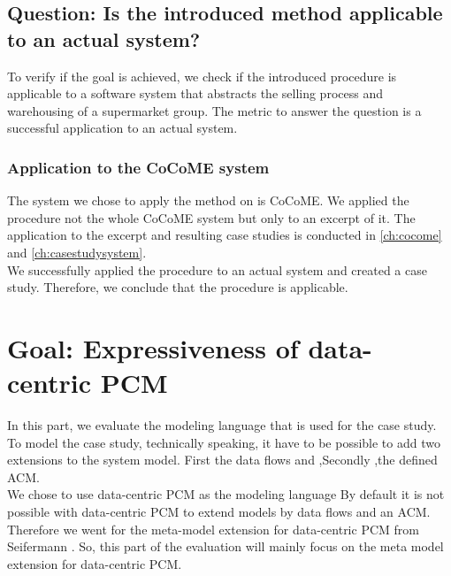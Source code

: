 \subsection{Question: Is the introduced method applicable to an actual system?}
To verify if the goal is achieved, we check if the introduced procedure is applicable to a software system that abstracts the selling process and warehousing of a supermarket group. The metric to answer the question is a successful application to an actual system.  
\subsubsection{Application to the CoCoME system}
The system we chose to apply the method on is CoCoME. We applied the procedure not the whole CoCoME system but only to an excerpt of it. The application to the excerpt and resulting case studies is conducted in \autoref{ch:cocome} and \autoref{ch:casestudysystem}.\\ We successfully applied the procedure to an actual system and created a case study. Therefore, we conclude that the procedure is applicable.


\section{Goal: Expressiveness of data-centric PCM}
In this part, we evaluate the modeling language that is used for the case study. To model the case study, technically speaking, it have to be possible to add two extensions to the system model. First the data flows and ,Secondly ,the defined ACM.\\ We chose to use data-centric PCM as the modeling language %
By default it is not possible with data-centric PCM to extend models by data flows and an ACM. Therefore we went for the meta-model extension for data-centric PCM from Seifermann \cite{MMextension}. So, this part of the evaluation will mainly focus on the meta model extension for data-centric PCM. 

